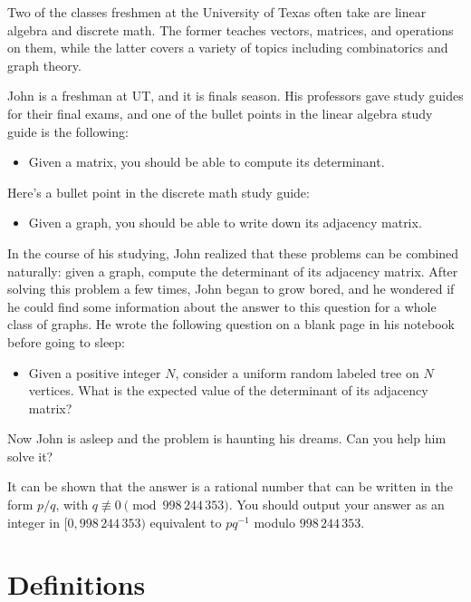 
Two of the classes freshmen at the University of Texas often take are
linear algebra and discrete math. The former teaches vectors, matrices, and
operations on them, while the latter covers a variety of topics including
combinatorics and graph theory.

John is a freshman at UT, and it is finals season. His professors gave study
guides for their final exams, and one of the bullet points in the linear
algebra study guide is the following:

\begin{itemize}
    \item Given a matrix, you should be able to compute its determinant.
\end{itemize}

Here's a bullet point in the discrete math study guide:

\begin{itemize}
    \item Given a graph, you should be able to write down its adjacency matrix.
\end{itemize}

In the course of his studying, John realized that these problems can be
combined naturally: given a graph, compute the determinant of its adjacency
matrix. After solving this problem a few times, John began to grow bored, and
he wondered if he could find some information about the answer to this question
for a whole class of graphs. He wrote the following question on a blank page
in his notebook before going to sleep:

\begin{itemize}
    \item Given a positive integer $N$, consider a uniform random labeled tree
        on $N$ vertices. What is the expected value of the determinant of its
        adjacency matrix?
\end{itemize}

Now John is asleep and the problem is haunting his dreams. Can you help him
solve it?

It can be shown that the answer is a rational number that can be written in
the form $p/q$, with $q \not\equiv 0 \pmod{998\,244\,353}$. You should output
your answer as an integer in $[0, 998\,244\,353)$ equivalent to $pq^{-1}$
modulo $998\,244\,353$.

\section*{Definitions}

